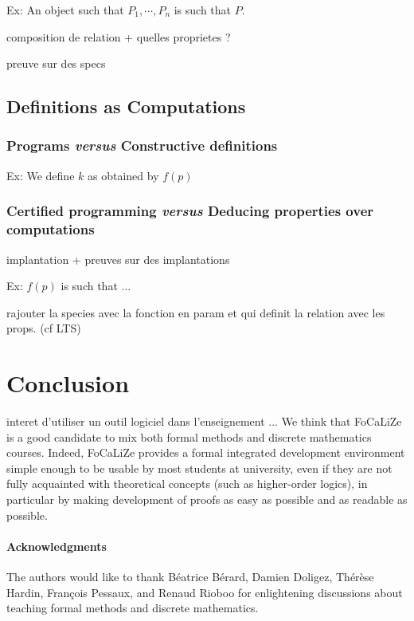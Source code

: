 \documentclass[submission,copyright,creativecommons]{eptcs}
\def\focalize{FoCaLiZe \mbox{}}
\begin{document}
Ex: An object such that $P_1, \cdots, P_n$ is such that $P$.

composition de relation + quelles proprietes  ? 

preuve sur des specs

\subsection{Definitions as Computations}

\subsubsection{Programs {\it versus} Constructive definitions}

Ex: We define $k$ as obtained by $f(p)$

\subsubsection{Certified programming {\it versus} Deducing properties
  over computations}

implantation + preuves sur des implantations

Ex: $f(p)$ is such that ...

rajouter la species avec la fonction en param et qui definit la
relation avec les props. (cf LTS)


\section{Conclusion}

interet d'utiliser un outil logiciel dans l'enseignement ...
We think that \focalize is a good candidate to mix both formal
methods and discrete mathematics courses. Indeed,  \focalize provides
a formal integrated development environment simple enough to be 
usable by most students at university, even if they are not fully
acquainted with theoretical concepts (such as 
higher-order logics), in particular by making development
of proofs as easy as possible and as readable  as possible.

\paragraph{Acknowledgments}
The authors would like to thank B\'eatrice B\'erard, Damien Doligez, Th\'er\`ese Hardin,
Fran\c{c}ois Pessaux,  and Renaud Rioboo for enlightening discussions
about teaching formal methods and discrete mathematics.





\end{document}
